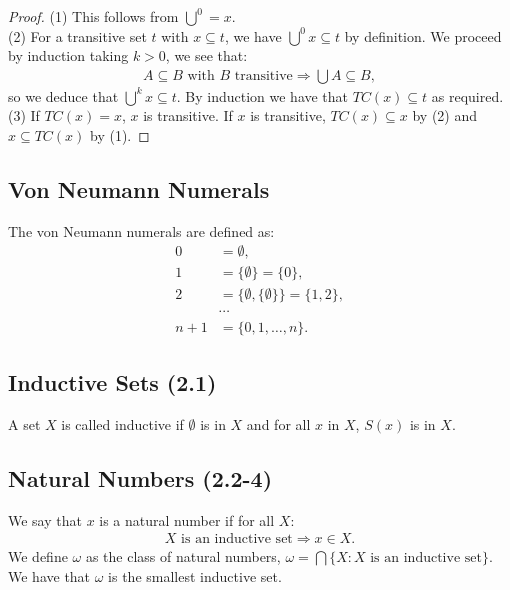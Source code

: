 \begin{proof}
    (1) This follows from ${\bigcup}^0 = x$.
    \\[\baselineskip]
    (2) For a transitive set $t$ with $x \subseteq t$, we have 
    ${\bigcup}^0 x \subseteq t$ by definition.
    We proceed by induction taking $k > 0$, we see that: \begin{align*}
        A \subseteq B \text{ with } B \text{ transitive} 
        \Longrightarrow \bigcup A \subseteq B,
    \end{align*} so we deduce that ${\bigcup}^k x \subseteq t$. By
    induction we have that $TC(x) \subseteq t$ as required.
    \\[\baselineskip]
    (3) If $TC(x) = x$, $x$ is transitive. If $x$ is transitive, 
    $TC(x) \subseteq x$ by (2) and $x \subseteq TC(x)$ by (1).
\end{proof}

\subsection{Von Neumann Numerals}

The von Neumann numerals are defined as: \begin{align*}
    0 &= \emptyset, \\
    1 &= \{\emptyset\} = \{0\}, \\
    2 &= \{\emptyset, \{\emptyset\}\} = \{1, 2\}, \\
    & \cdots \\
    n + 1 &= \{0, 1, \ldots, n\}.
\end{align*}

\subsection{Inductive Sets (2.1)} \label{2.1}

A set $X$ is called inductive if $\emptyset$ is in $X$ and
for all $x$ in $X$, $S(x)$ is in $X$.

\subsection{Natural Numbers (2.2-4)} \label{2.2} \label{2.3} \label{2.4}

We say that $x$ is a natural number if for all $X$: \begin{align*}
    X \text{ is an inductive set} \Longrightarrow x \in X.
\end{align*} We define $\omega$ as the class of natural numbers,
$\omega = \bigcap\{X : X \text{ is an inductive set}\}$. We have that
$\omega$ is the smallest inductive set.

